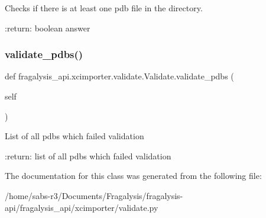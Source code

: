 \begin{DoxyVerb}Checks if there is at least one pdb file in the directory.

:return: boolean answer
\end{DoxyVerb}
 \mbox{\label{classfragalysis__api_1_1xcimporter_1_1validate_1_1_validate_a1e2236300274a3e4c91944ff8a10f432}} 
\subsubsection{\texorpdfstring{validate\+\_\+pdbs()}{validate\_pdbs()}}
{\footnotesize\ttfamily def fragalysis\+\_\+api.\+xcimporter.\+validate.\+Validate.\+validate\+\_\+pdbs (\begin{DoxyParamCaption}\item[{}]{self }\end{DoxyParamCaption})}

\begin{DoxyVerb}List of all pdbs which failed validation

:return: list of all pdbs which failed validation
\end{DoxyVerb}
 

The documentation for this class was generated from the following file\+:\begin{DoxyCompactItemize}
\item 
/home/sabs-\/r3/\+Documents/\+Fragalysis/fragalysis-\/api/fragalysis\+\_\+api/xcimporter/validate.\+py\end{DoxyCompactItemize}
